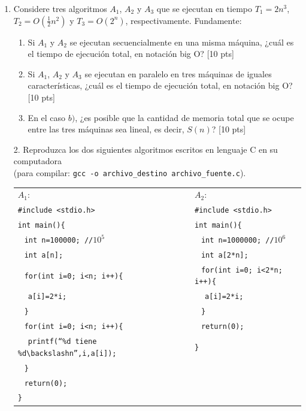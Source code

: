 \documentclass[letter,12pt,oneside]{book}
\theoremstyle{definition}
\begin{document}
\begin{enumerate}
    \item Considere tres algoritmos $A_1$, $A_2$ y $A_3$ que se ejecutan en tiempo $T_1=2n^3$, $T_2=O(\frac{1}{2}n^2)$ y $T_3=O(2^n)$, respectivamente. Fundamente:
    \begin{enumerate}
        \item Si $A_1$ y $A_2$ se ejecutan secuencialmente en una misma máquina, ¿cuál es el tiempo de ejecución total, en notación big O? \tabto{76ex} [10 pts]
        \item Si $A_1$, $A_2$ y $A_3$ se ejecutan en paralelo en tres máquinas de iguales características, ¿cuál es el tiempo de ejecución total, en notación big O? \tabto{76ex} [10 pts]
        \item En el caso $b)$, ¿es posible que la cantidad de memoria total que se ocupe entre las tres máquinas sea lineal, es decir, $S(n)$? \tabto{76ex} [10 pts]
    \end{enumerate}
    
    \item[2.] Reproduzca los dos siguientes algoritmos escritos en lenguaje C en su computadora\\
    (para compilar: \texttt{gcc -o archivo\_destino archivo\_fuente.c}).
    
    
    \begin{tabular}{|p{40ex}|p{40ex}|}\hline
        $A_1:$ & $A_2:$ \\
        \texttt{\#include <stdio.h>}  
                    & \texttt{\#include <stdio.h>} \\
        \texttt{int main()\{} 
                    & \texttt{int main()\{} \\
        $~~$ \texttt{int n=100000; //$10^5$} 
                    & $~~$ \texttt{int n=1000000; //$10^6$} \\
        $~~$ \texttt{int a[n];} 
                    & $~~$ \texttt{int a[2*n];} \\
        $~~$ \texttt{for(int i=0; i<n; i++)\{}
                    & $~~$ \texttt{for(int i=0; i<2*n; i++)\{}\\
        $~~~~$ \texttt{a[i]=2*i;} 
                    & $~~~~$ \texttt{a[i]=2*i;}\\
        $~~$ \texttt{\}} & $~~$ \texttt{\}}\\
        $~~$ \texttt{for(int i=0; i<n; i++)\{} 
                    & $~~$ \texttt{return(0);}\\
        $~~~~$ \texttt{printf(``\%d tiene \%d$\backslash$n'',i,a[i]);} & \texttt{\}}\\
        $~~$ \texttt{\}} & \\
        $~~$ \texttt{return(0);} & \\
        \texttt{\}} & \\\hline
    \end{tabular}
    

\end{enumerate}
\end{document}
